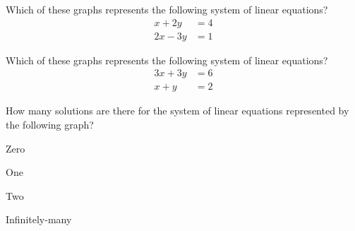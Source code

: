 \begin{readinessAssuranceTest}
\item Which of these graphs represents the following system of linear equations?
      \begin{align*}
      x+2y   &=   4 \\
      2x-3y  &=  1
      \end{align*}

\begin{multicols}{4}
\begin{readinessAssuranceTestChoices}
\item \systemWithOneSolutionA %
\item \systemWithOneSolutionB
\item \systemWithInfinitelyManySolutions
\item \systemWithNoSolutions
\end{readinessAssuranceTestChoices}
\end{multicols}

\item Which of these graphs represents the following system of linear equations?
      \begin{align*}
      3x+3y   &=   6 \\
      x+y  &=  2
      \end{align*}

\begin{multicols}{4}
\begin{readinessAssuranceTestChoices}
\item \systemWithOneSolutionA
\item \systemWithOneSolutionB
\item \systemWithInfinitelyManySolutions %
\item \systemWithNoSolutions
\end{readinessAssuranceTestChoices}
\end{multicols}


\item How many solutions are there for the system of linear equations
      represented by the following graph?
    \begin{center}
      \systemWithOneSolutionB
    \end{center}

\begin{multicols}{4}
\begin{readinessAssuranceTestChoices}
\item Zero
\item One %
\item Two
\item Infinitely-many
\end{readinessAssuranceTestChoices}
\end{multicols}



\end{readinessAssuranceTest}
